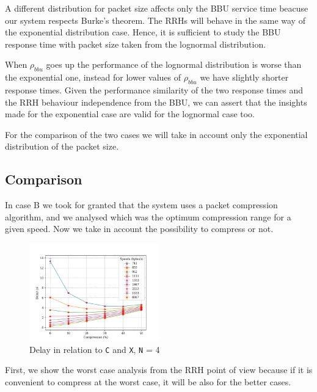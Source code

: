 \documentclass[11pt,a4paper,oneside, openright]{article}
\begin{document}
A different distribution for packet size affects only the BBU service time beacuse our system respects Burke's theorem. The RRHs will behave in the same way of the exponential distribution case. Hence, it is sufficient to study the BBU response time with packet size taken from the lognormal distribution.


When $\rho_{bbu}$ goes up the performance of the lognormal distribution is worse than the exponential one, instead for lower values of $\rho_{bbu}$ we have slightly shorter response times. Given the performance similarity of the two response times and the RRH behaviour independence from the BBU, we can assert that the insights made for the exponential case are valid for the lognormal case too.

For the comparison of the two cases we will take in account only the exponential distribution of the packet size.
\newpage
\subsection{Comparison}
In case B we took for granted that the system uses a packet compression algorithm, and we analysed which was the optimum compression range for a given speed. Now we take in account the possibility to compress or not. 

\begin{figure}[h]
	\centering
	\includegraphics[width=0.5\textwidth]{images/c-vs-delay-n-4}
	\caption{Delay in relation to \texttt{C} and \texttt{X}, \texttt{N} = 4} 
	\label{fig:c-vs-delay-n-4}
\end{figure}

First, we show the worst case analysis from the RRH point of view because if it is convenient to compress at the worst case, it will be also for the better cases. 
\end{document}
